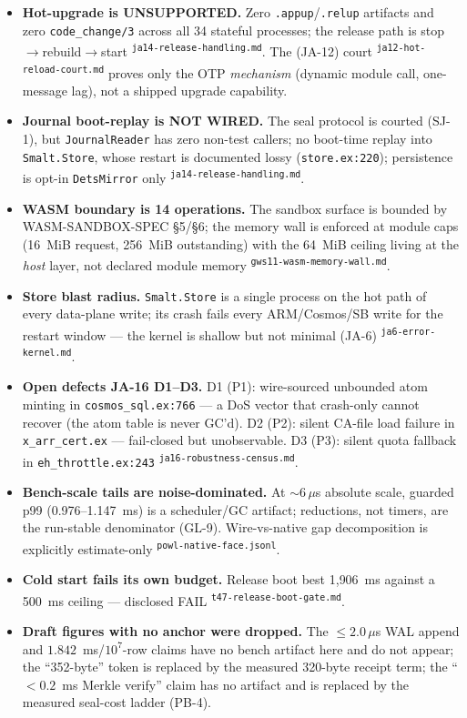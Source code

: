 \documentclass[11pt,a4paper]{article}
\newcommand{\art}[1]{\textsuperscript{\tiny\texttt{#1}}}
\begin{document}
\begin{itemize}[leftmargin=1.4em]
\item \textbf{Hot-upgrade is UNSUPPORTED.} Zero \texttt{.appup}/\texttt{.relup} artifacts and
zero \texttt{code\_change/3} across all 34 stateful processes; the release path is
stop$\to$rebuild$\to$start \art{ja14-release-handling.md}. The (JA-12) court
\art{ja12-hot-reload-court.md} proves only the OTP \emph{mechanism} (dynamic module call,
one-message lag), not a shipped upgrade capability.
\item \textbf{Journal boot-replay is NOT WIRED.} The seal protocol is courted (SJ-1), but
\texttt{JournalReader} has zero non-test callers; no boot-time replay into \texttt{Smalt.Store},
whose restart is documented lossy (\texttt{store.ex:220}); persistence is opt-in
\texttt{DetsMirror} only \art{ja14-release-handling.md}.
\item \textbf{WASM boundary is 14 operations.} The sandbox surface is bounded by
WASM-SANDBOX-SPEC \S5/\S6; the memory wall is enforced at module caps (16~MiB request,
256~MiB outstanding) with the 64~MiB ceiling living at the \emph{host} layer, not declared
module memory \art{gws11-wasm-memory-wall.md}.
\item \textbf{Store blast radius.} \texttt{Smalt.Store} is a single process on the hot path
of every data-plane write; its crash fails every ARM/Cosmos/SB write for the restart window
--- the kernel is shallow but not minimal (JA-6) \art{ja6-error-kernel.md}.
\item \textbf{Open defects JA-16 D1--D3.} D1 (P1): wire-sourced unbounded atom minting in
\texttt{cosmos\_sql.ex:766} --- a DoS vector that crash-only cannot recover (the atom table
is never GC'd). D2 (P2): silent CA-file load failure in \texttt{x\_arr\_cert.ex} ---
fail-closed but unobservable. D3 (P3): silent quota fallback in \texttt{eh\_throttle.ex:243}
\art{ja16-robustness-census.md}.
\item \textbf{Bench-scale tails are noise-dominated.} At $\sim$6\,$\mu$s absolute scale,
guarded p99 (0.976--1.147~ms) is a scheduler/GC artifact; reductions, not timers, are the
run-stable denominator (GL-9). Wire-vs-native gap decomposition is explicitly estimate-only
\art{powl-native-face.jsonl}.
\item \textbf{Cold start fails its own budget.} Release boot best 1{,}906~ms against a
500~ms ceiling --- disclosed FAIL \art{t47-release-boot-gate.md}.
\item \textbf{Draft figures with no anchor were dropped.} The $\le 2.0\,\mu$s WAL append and
$1.842$~ms/$10^7$-row claims have no bench artifact here and do not appear; the
``352-byte'' token is replaced by the measured 320-byte receipt term; the
``$<0.2$~ms Merkle verify'' claim has no artifact and is replaced by the measured seal-cost
ladder (PB-4).
\end{itemize}
\end{document}
